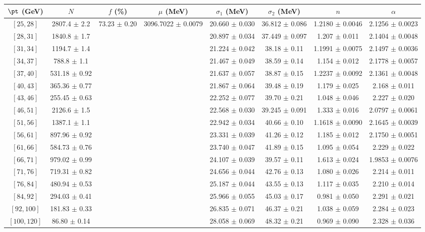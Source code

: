 \begin{tabular}{c||c|c|c|c|c|c|c}
$\pt$ (GeV) & $N$ & $f$ (\%) & $\mu$ (MeV) & $\sigma_1$ (MeV) & $\sigma_2$ (MeV) & $n$ & $\alpha$ \\
\hline
$[25, 28]$ & 2807.4 $\pm$ 2.2 & \multirow{17}{*}{73.23 $\pm$ 0.20} & \multirow{17}{*}{3096.7022 $\pm$ 0.0079} & 20.660 $\pm$ 0.030 & 36.812 $\pm$ 0.086 & 1.2180 $\pm$ 0.0046 & 2.1256 $\pm$ 0.0023\\
$[28, 31]$ & 1840.8 $\pm$ 1.7 &  &  & 20.897 $\pm$ 0.034 & 37.449 $\pm$ 0.097 & 1.207 $\pm$ 0.011 & 2.1404 $\pm$ 0.0048\\
$[31, 34]$ & 1194.7 $\pm$ 1.4 &  &  & 21.224 $\pm$ 0.042 & 38.18 $\pm$ 0.11 & 1.1991 $\pm$ 0.0075 & 2.1497 $\pm$ 0.0036\\
$[34, 37]$ & 788.8 $\pm$ 1.1 &  &  & 21.467 $\pm$ 0.049 & 38.59 $\pm$ 0.14 & 1.154 $\pm$ 0.012 & 2.1778 $\pm$ 0.0057\\
$[37, 40]$ & 531.18 $\pm$ 0.92 &  &  & 21.637 $\pm$ 0.057 & 38.87 $\pm$ 0.15 & 1.2237 $\pm$ 0.0092 & 2.1361 $\pm$ 0.0048\\
$[40, 43]$ & 365.36 $\pm$ 0.77 &  &  & 21.867 $\pm$ 0.064 & 39.48 $\pm$ 0.19 & 1.179 $\pm$ 0.025 & 2.168 $\pm$ 0.011\\
$[43, 46]$ & 255.45 $\pm$ 0.63 &  &  & 22.252 $\pm$ 0.077 & 39.70 $\pm$ 0.21 & 1.048 $\pm$ 0.046 & 2.227 $\pm$ 0.020\\
$[46, 51]$ & 2126.6 $\pm$ 1.5 &  &  & 22.568 $\pm$ 0.030 & 39.245 $\pm$ 0.091 & 1.333 $\pm$ 0.016 & 2.0797 $\pm$ 0.0061\\
$[51, 56]$ & 1387.1 $\pm$ 1.1 &  &  & 22.942 $\pm$ 0.034 & 40.66 $\pm$ 0.10 & 1.1618 $\pm$ 0.0090 & 2.1645 $\pm$ 0.0039\\
$[56, 61]$ & 897.96 $\pm$ 0.92 &  &  & 23.331 $\pm$ 0.039 & 41.26 $\pm$ 0.12 & 1.185 $\pm$ 0.012 & 2.1750 $\pm$ 0.0051\\
$[61, 66]$ & 584.73 $\pm$ 0.76 &  &  & 23.740 $\pm$ 0.047 & 41.89 $\pm$ 0.15 & 1.095 $\pm$ 0.054 & 2.229 $\pm$ 0.022\\
$[66, 71]$ & 979.02 $\pm$ 0.99 &  &  & 24.107 $\pm$ 0.039 & 39.57 $\pm$ 0.11 & 1.613 $\pm$ 0.024 & 1.9853 $\pm$ 0.0076\\
$[71, 76]$ & 719.31 $\pm$ 0.82 &  &  & 24.656 $\pm$ 0.044 & 42.76 $\pm$ 0.13 & 1.080 $\pm$ 0.026 & 2.214 $\pm$ 0.011\\
$[76, 84]$ & 480.94 $\pm$ 0.53 &  &  & 25.187 $\pm$ 0.044 & 43.55 $\pm$ 0.13 & 1.117 $\pm$ 0.035 & 2.210 $\pm$ 0.014\\
$[84, 92]$ & 294.03 $\pm$ 0.41 &  &  & 25.966 $\pm$ 0.055 & 45.03 $\pm$ 0.17 & 0.981 $\pm$ 0.050 & 2.291 $\pm$ 0.021\\
$[92, 100]$ & 181.83 $\pm$ 0.33 &  &  & 26.835 $\pm$ 0.071 & 46.37 $\pm$ 0.21 & 1.038 $\pm$ 0.059 & 2.284 $\pm$ 0.023\\
$[100, 120]$ & 86.80 $\pm$ 0.14 &  &  & 28.058 $\pm$ 0.069 & 48.32 $\pm$ 0.21 & 0.969 $\pm$ 0.090 & 2.328 $\pm$ 0.036\\
\end{tabular}
